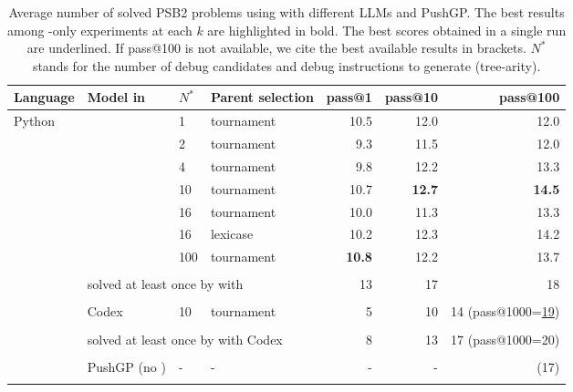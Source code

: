\begin{table}[b]
    \centering
    \caption{Average number of solved PSB2 problems using \method{} with different LLMs and PushGP. The best results among \method{}-only experiments at each $k$ are highlighted in bold. The best scores obtained in a single run are underlined. If pass@100 is not available, we cite the best available results in brackets. $N^*$ stands for the number of debug candidates and debug instructions to generate (tree-arity).}\small
    \label{tab:generalizability-psb2}
\begin{adjustbox}{max width=.92\textwidth}
\begin{DIFnomarkup} %
\begin{tabular}{llllrrr}
\toprule
Language & Model in \method{} & $N^*$ & Parent selection &  pass@1 &  pass@10 &  pass@100 \\
\midrule
% 
Python & \gpt{} & 1   &         tournament &    10.5 &     12.0 &      12.0 \\
    &        & 2   &         tournament &     9.3 &     11.5 &      12.0 \\
    &        & 4   &         tournament &     9.8 &     12.2 &      13.3 \\
    &        & 10  &         tournament &    10.7 &     \textbf{12.7} &      \textbf{14.5} \\
    &        & 16  &         tournament &    10.0 &     11.3 &      13.3 \\
    &        & 16  &           lexicase &    10.2 &     12.3 &      14.2 \\
    &        & 100 &         tournament &    \textbf{10.8} &     12.2 &      13.7 \\
\cline{3-7}\\[-8pt]
    &  \multicolumn{3}{l}{solved at least once by \method{} with \gpt{}} &  13 &       17 &       18 \\[1pt]
\cline{2-7}\\[-8pt]
        & Codex  & 10 & tournament &      5 &       10 &        14 (pass@1000=\underline{19}) \\[1pt]
\cline{3-7}\\[-8pt]
       &  \multicolumn{3}{l}{solved at least once by \method{} with Codex}   & 8 &       13 &        17 (pass@1000=20) \\[3pt]
\cline{2-7}\\[-8pt]
        &  PushGP (no \method{})   &    -            &       - &        - &       - &  (17)\\[1pt]
\cline{2-7}\\[-8pt]

\end{tabular}
\end{DIFnomarkup}
\end{adjustbox}
\end{table}
